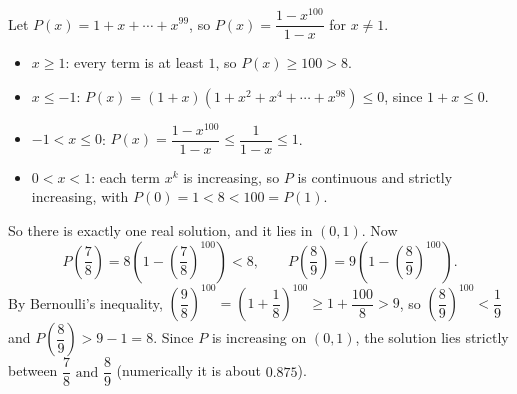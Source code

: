 Let $P(x)=1+x+\cdots+x^{99}$, so $P(x)=\dfrac{1-x^{100}}{1-x}$ for $x\ne1$.
\begin{itemize}
\item $x\ge1$: every term is at least $1$, so $P(x)\ge100>8$.
\item $x\le-1$: $P(x)=(1+x)(1+x^2+x^4+\cdots+x^{98})\le0$, since $1+x\le0$.
\item $-1<x\le0$: $P(x)=\dfrac{1-x^{100}}{1-x}\le\dfrac{1}{1-x}\le1$.
\item $0<x<1$: each term $x^k$ is increasing, so $P$ is continuous and strictly increasing, with $P(0)=1<8<100=P(1)$.
\end{itemize}
So there is exactly one real solution, and it lies in $(0,1)$. Now
\[
P\!\left(\dfrac{7}{8}\right)=8\left(1-\left(\dfrac{7}{8}\right)^{100}\right)<8,\qquad P\!\left(\dfrac{8}{9}\right)=9\left(1-\left(\dfrac{8}{9}\right)^{100}\right).
\]
By Bernoulli's inequality, $\left(\dfrac{9}{8}\right)^{100}=\left(1+\dfrac{1}{8}\right)^{100}\ge1+\dfrac{100}{8}>9$, so $\left(\dfrac{8}{9}\right)^{100}<\dfrac{1}{9}$ and $P\!\left(\dfrac{8}{9}\right)>9-1=8$. Since $P$ is increasing on $(0,1)$, the solution lies strictly between $\boxed{\dfrac{7}{8}\text{ and }\dfrac{8}{9}}$ (numerically it is about $0.875$).
